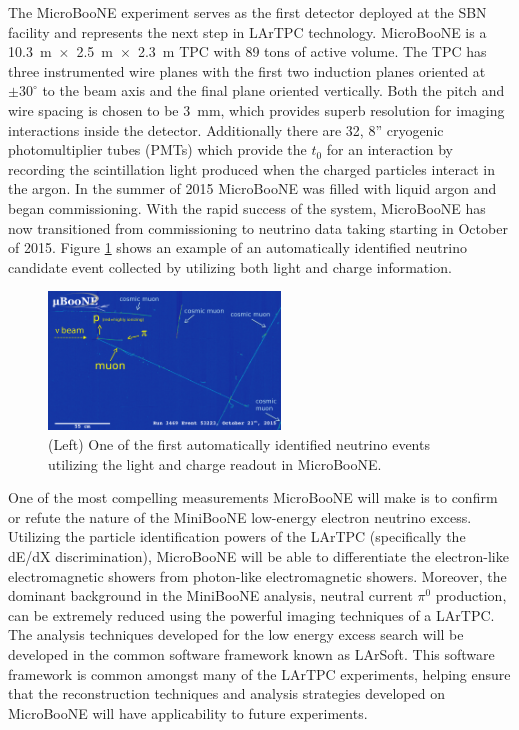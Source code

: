 \label{sec:IF_MicroBooNE}
The MicroBooNE experiment serves as the first detector deployed at the SBN facility and represents the next step in LArTPC technology. MicroBooNE is a 10.3~m~$\times$~2.5~m~$\times$~2.3~m TPC with 89 tons of active volume. The TPC has three instrumented wire planes with the first two induction planes oriented at $\pm 30^{\circ}$ to the beam axis and the final plane oriented vertically. Both the pitch and wire spacing is chosen to be 3~mm, which provides superb resolution for imaging interactions inside the detector. Additionally there are 32, 8'' cryogenic photomultiplier tubes (PMTs) which provide the $t_{0}$ for an interaction by recording the scintillation light produced when the charged particles interact in the argon. In the summer of 2015 MicroBooNE was filled with liquid argon and began commissioning.  With the rapid success of the system, MicroBooNE has now transitioned from commissioning to neutrino data taking starting in October of 2015. Figure \ref{fig:uboone} shows an example of an automatically identified neutrino candidate event collected by utilizing both light and charge information. 

\begin{figure}[htb]
\centering
\includegraphics[width=0.55\textwidth]{images/ubooneNeutrino.png}
\caption[]{(Left) One of the first automatically identified neutrino events utilizing the light and charge readout in MicroBooNE.}
\label{fig:uboone}
\end{figure}

One of the most compelling measurements MicroBooNE will make is to confirm or refute the nature of the MiniBooNE low-energy electron neutrino excess. Utilizing the particle identification powers of the LArTPC (specifically the dE/dX discrimination), MicroBooNE will be able to differentiate the electron-like electromagnetic showers from photon-like electromagnetic showers. Moreover, the dominant background in the MiniBooNE analysis, neutral current $\pi^{0}$ production, can be extremely reduced using the powerful imaging techniques of a LArTPC. The analysis techniques developed for the low energy excess search will be developed in the common software framework known as LArSoft. This software framework is common amongst many of the LArTPC experiments, helping ensure that the reconstruction techniques and analysis strategies developed on MicroBooNE will have applicability to future experiments.

